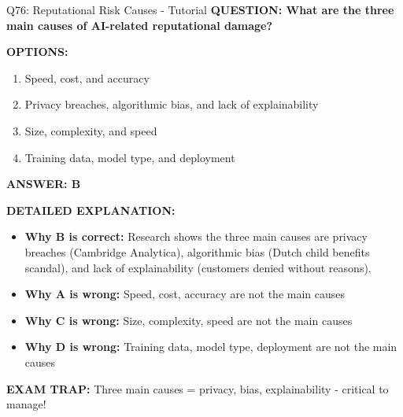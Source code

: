 \documentclass[8pt]{beamer}
\begin{document}
	\begin{frame}{Q76: Reputational Risk Causes - Tutorial}
		\fontsize{6.5}{7.5}\selectfont
		\textbf{QUESTION: What are the three main causes of AI-related reputational damage?}
		
		\vspace{0.1cm}
		\textbf{OPTIONS:}
		\begin{enumerate}
			\item Speed, cost, and accuracy
			\item Privacy breaches, algorithmic bias, and lack of explainability
			\item Size, complexity, and speed
			\item Training data, model type, and deployment
		\end{enumerate}
		
		\vspace{0.1cm}
		\textcolor{myblue}{\textbf{ANSWER: B}}
		
		\vspace{0.1cm}
		\textbf{DETAILED EXPLANATION:}
		\begin{itemize}
			\item \textbf{Why B is correct:} Research shows the three main causes are privacy breaches (Cambridge Analytica), algorithmic bias (Dutch child benefits scandal), and lack of explainability (customers denied without reasons).
			\item \textbf{Why A is wrong:} Speed, cost, accuracy are not the main causes
			\item \textbf{Why C is wrong:} Size, complexity, speed are not the main causes
			\item \textbf{Why D is wrong:} Training data, model type, deployment are not the main causes
		\end{itemize}
		
		\textcolor{myred}{\textbf{EXAM TRAP:}} Three main causes = \textcolor{myblue}{privacy, bias, explainability} - critical to manage!
	\end{frame}
	
\end{document}

